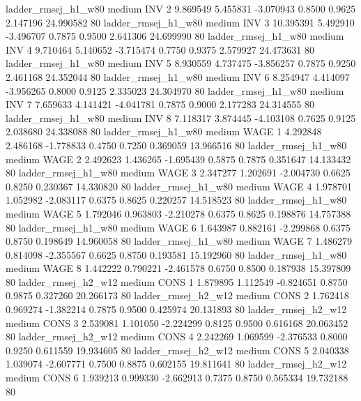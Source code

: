    ladder_rmsej_h1_w80     medium      INV                 2  9.869549 5.455831 -3.070943 0.8500 0.9625  2.147196   24.990582 80
   ladder_rmsej_h1_w80     medium      INV                 3 10.395391 5.492910 -3.496707 0.7875 0.9500  2.641306   24.699990 80
   ladder_rmsej_h1_w80     medium      INV                 4  9.710464 5.140652 -3.715474 0.7750 0.9375  2.579927   24.473631 80
   ladder_rmsej_h1_w80     medium      INV                 5  8.930559 4.737475 -3.856257 0.7875 0.9250  2.461168   24.352044 80
   ladder_rmsej_h1_w80     medium      INV                 6  8.254947 4.414097 -3.956265 0.8000 0.9125  2.335023   24.304970 80
   ladder_rmsej_h1_w80     medium      INV                 7  7.659633 4.141421 -4.041781 0.7875 0.9000  2.177283   24.314555 80
   ladder_rmsej_h1_w80     medium      INV                 8  7.118317 3.874445 -4.103108 0.7625 0.9125  2.038680   24.338088 80
   ladder_rmsej_h1_w80     medium     WAGE                 1  4.292848 2.486168 -1.778833 0.4750 0.7250  0.369059   13.966516 80
   ladder_rmsej_h1_w80     medium     WAGE                 2  2.492623 1.436265 -1.695439 0.5875 0.7875  0.351647   14.133432 80
   ladder_rmsej_h1_w80     medium     WAGE                 3  2.347277 1.202691 -2.004730 0.6625 0.8250  0.230367   14.330820 80
   ladder_rmsej_h1_w80     medium     WAGE                 4  1.978701 1.052982 -2.083117 0.6375 0.8625  0.220257   14.518523 80
   ladder_rmsej_h1_w80     medium     WAGE                 5  1.792046 0.963803 -2.210278 0.6375 0.8625  0.198876   14.757388 80
   ladder_rmsej_h1_w80     medium     WAGE                 6  1.643987 0.882161 -2.299868 0.6375 0.8750  0.198649   14.960058 80
   ladder_rmsej_h1_w80     medium     WAGE                 7  1.486279 0.814098 -2.355567 0.6625 0.8750  0.193581   15.192960 80
   ladder_rmsej_h1_w80     medium     WAGE                 8  1.442222 0.790221 -2.461578 0.6750 0.8500  0.187938   15.397809 80
   ladder_rmsej_h2_w12     medium     CONS                 1  1.879895 1.112549 -0.824651 0.8750 0.9875  0.327260   20.266173 80
   ladder_rmsej_h2_w12     medium     CONS                 2  1.762418 0.969274 -1.382214 0.7875 0.9500  0.425974   20.131893 80
   ladder_rmsej_h2_w12     medium     CONS                 3  2.539081 1.101050 -2.224299 0.8125 0.9500  0.616168   20.063452 80
   ladder_rmsej_h2_w12     medium     CONS                 4  2.242269 1.069599 -2.376533 0.8000 0.9250  0.611559   19.934605 80
   ladder_rmsej_h2_w12     medium     CONS                 5  2.040338 1.039074 -2.607771 0.7500 0.8875  0.602155   19.811641 80
   ladder_rmsej_h2_w12     medium     CONS                 6  1.939213 0.999330 -2.662913 0.7375 0.8750  0.565334   19.732188 80
